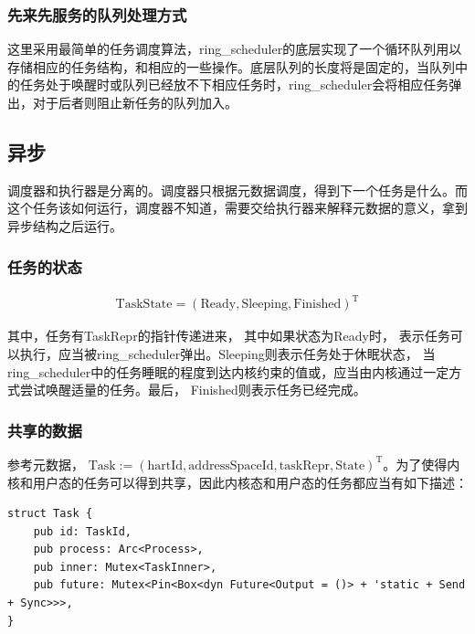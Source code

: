 \subsubsection{先来先服务的队列处理方式}

这里采用最简单的任务调度算法，ring\_scheduler的底层实现了一个循环队列用以存储相应的任务结构，和相应的一些操作。底层队列的长度将是固定的，当队列中的任务处于唤醒时或队列已经放不下相应任务时，ring\_scheduler会将相应任务弹出，对于后者则阻止新任务的队列加入。

\subsection{异步}

调度器和执行器是分离的。调度器只根据元数据调度，得到下一个任务是什么。而这个任务该如何运行，调度器不知道，需要交给执行器来解释元数据的意义，拿到异步结构之后运行。

\subsubsection{任务的状态}

\begin{equation}
    \label{equation:c3taskstate}
    \begin{aligned}
\boldsymbol{\mathrm{TaskState}} = (\mathrm{Ready}, \mathrm{Sleeping}, \mathrm{Finished})^{\mathrm{T}}
    \end{aligned}
\end{equation}

其中，任务有TaskRepr的指针传递进来， 其中如果状态为Ready时， 表示任务可以执行，应当被ring\_scheduler弹出。Sleeping则表示任务处于休眠状态， 当ring\_scheduler中的任务睡眠的程度到达内核约束的值或，应当由内核通过一定方式尝试唤醒适量的任务。最后， Finished则表示任务已经完成。

\subsubsection{共享的数据}

参考元数据， $\boldsymbol{\mathrm{Task}} := (\mathrm{hartId}, \mathrm{addressSpaceId}, \mathrm{taskRepr}, \mathrm{State})^{\mathrm{T}}$。为了使得内核和用户态的任务可以得到共享，因此内核态和用户态的任务都应当有如下描述：

\begin{lstlisting}
struct Task {
    pub id: TaskId,
    pub process: Arc<Process>,
    pub inner: Mutex<TaskInner>,
    pub future: Mutex<Pin<Box<dyn Future<Output = ()> + 'static + Send + Sync>>>, 
}
\end{lstlisting}

